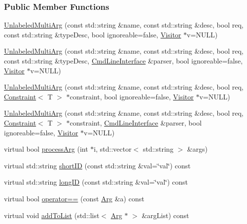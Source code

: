 \subsubsection*{Public Member Functions}
\begin{DoxyCompactItemize}
\item 
\hyperlink{classTCLAP_1_1UnlabeledMultiArg_a776c124bf343d0ecfb73e7cc28423807}{Unlabeled\+Multi\+Arg} (const std\+::string \&name, const std\+::string \&desc, bool req, const std\+::string \&type\+Desc, bool ignoreable=false, \hyperlink{classTCLAP_1_1Visitor}{Visitor} $\ast$v=N\+U\+LL)
\item 
\hyperlink{classTCLAP_1_1UnlabeledMultiArg_a5c81005897f6b9673b39f5d1107f4074}{Unlabeled\+Multi\+Arg} (const std\+::string \&name, const std\+::string \&desc, bool req, const std\+::string \&type\+Desc, \hyperlink{classTCLAP_1_1CmdLineInterface}{Cmd\+Line\+Interface} \&parser, bool ignoreable=false, \hyperlink{classTCLAP_1_1Visitor}{Visitor} $\ast$v=N\+U\+LL)
\item 
\hyperlink{classTCLAP_1_1UnlabeledMultiArg_aa065c76cd23b4acfe62c4b31d73dcf87}{Unlabeled\+Multi\+Arg} (const std\+::string \&name, const std\+::string \&desc, bool req, \hyperlink{classTCLAP_1_1Constraint}{Constraint}$<$ T $>$ $\ast$constraint, bool ignoreable=false, \hyperlink{classTCLAP_1_1Visitor}{Visitor} $\ast$v=N\+U\+LL)
\item 
\hyperlink{classTCLAP_1_1UnlabeledMultiArg_ad3d8c37cd3c71deb2275b48115a59f11}{Unlabeled\+Multi\+Arg} (const std\+::string \&name, const std\+::string \&desc, bool req, \hyperlink{classTCLAP_1_1Constraint}{Constraint}$<$ T $>$ $\ast$constraint, \hyperlink{classTCLAP_1_1CmdLineInterface}{Cmd\+Line\+Interface} \&parser, bool ignoreable=false, \hyperlink{classTCLAP_1_1Visitor}{Visitor} $\ast$v=N\+U\+LL)
\item 
virtual bool \hyperlink{classTCLAP_1_1UnlabeledMultiArg_aa5a35665519518dcb60e53d3a4858802}{process\+Arg} (int $\ast$i, std\+::vector$<$ std\+::string $>$ \&args)
\item 
virtual std\+::string \hyperlink{classTCLAP_1_1UnlabeledMultiArg_a5971af8f29fa4d798ffde3293504c15b}{short\+ID} (const std\+::string \&val=\char`\"{}val\char`\"{}) const 
\item 
virtual std\+::string \hyperlink{classTCLAP_1_1UnlabeledMultiArg_a1e7262967b850fb30e1003890a45f1ca}{long\+ID} (const std\+::string \&val=\char`\"{}val\char`\"{}) const 
\item 
virtual bool \hyperlink{classTCLAP_1_1UnlabeledMultiArg_a059fa00203a9f643a10334fedbd43e39}{operator==} (const \hyperlink{classTCLAP_1_1Arg}{Arg} \&a) const 
\item 
virtual void \hyperlink{classTCLAP_1_1UnlabeledMultiArg_a290b15792de11abb5a4cf1c312d6a0d7}{add\+To\+List} (std\+::list$<$ \hyperlink{classTCLAP_1_1Arg}{Arg} $\ast$ $>$ \&arg\+List) const 
\end{DoxyCompactItemize}
